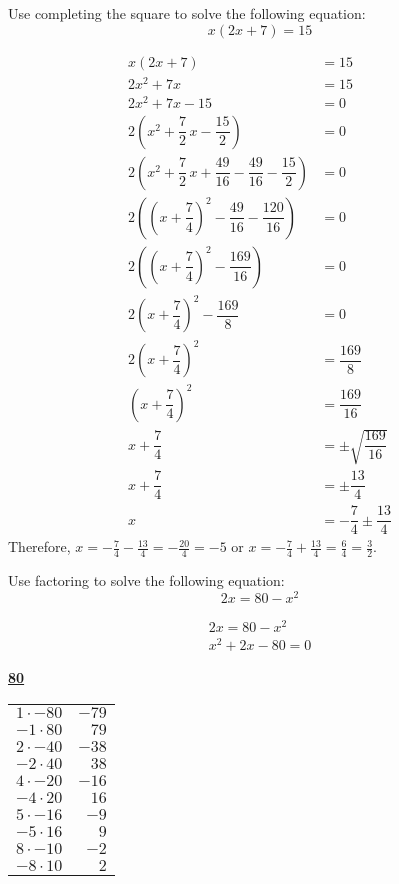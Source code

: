 \documentclass[11pt,letterpaper]{article}
\begin{document}

 Use completing the square to solve the following equation:
	\[
	x(2x + 7)= 15
	\] \pspace

\sol
	\[
	\begin{aligned}
	x(2x + 7)&= 15 \\[0.3cm]
	2x^2 + 7x&= 15 \\[0.3cm]
	2x^2 + 7x - 15&= 0 \\[0.3cm]
	2 \left(x^2 + \dfrac{7}{2}\,x - \dfrac{15}{2} \right)&= 0 \\[0.3cm]
	2 \left(x^2 + \dfrac{7}{2}\,x + \dfrac{49}{16} - \dfrac{49}{16} - \dfrac{15}{2} \right)&= 0 \\[0.3cm]
	2 \left( \left(x + \dfrac{7}{4} \right)^2 - \dfrac{49}{16} - \dfrac{120}{16} \right)&= 0 \\[0.3cm]
	2 \left( \left(x + \dfrac{7}{4} \right)^2  - \dfrac{169}{16} \right)&= 0 \\[0.3cm]
	2 \left(x + \dfrac{7}{4} \right)^2  - \dfrac{169}{8}&= 0 \\[0.3cm]
	2 \left(x + \dfrac{7}{4} \right)^2&= \dfrac{169}{8} \\[0.3cm] 
	\left(x + \dfrac{7}{4} \right)^2&= \dfrac{169}{16} \\[0.3cm]
	x + \dfrac{7}{4}&= \pm \sqrt{\dfrac{169}{16}} \\[0.3cm]
	x + \dfrac{7}{4}&= \pm \dfrac{13}{4} \\[0.3cm]
	x&= -\dfrac{7}{4} \pm \dfrac{13}{4}
	\end{aligned}
	\]
Therefore, $x= -\frac{7}{4} - \frac{13}{4}= -\frac{20}{4}= -5$ or $x= -\frac{7}{4} + \frac{13}{4}= \frac{6}{4}= \frac{3}{2}$. 


\newpage



 Use factoring to solve the following equation:
	\[
	2x= 80 - x^2
	\] \pspace

\sol
	\[
	\begin{aligned}
	2x= 80 - x^2 \\[0.3cm]
	x^2 + 2x - 80= 0 
	\end{aligned}
	\]

	\begin{table}[!ht]
	\centering
	\underline{\bfseries 80} \pvspace{0.2cm}
	\begin{tabular}{rr}
	$1 \cdot -80$ & $-79$ \\
	$-1 \cdot 80$ & $79$ \\
	$2 \cdot -40$ & $-38$ \\
	$-2 \cdot 40$ & $38$ \\
	$4 \cdot -20$ & $-16$ \\
	$-4 \cdot 20$ & $16$ \\
	$5 \cdot -16$ & $-9$ \\
	$-5 \cdot 16$ & $9$ \\
	$8 \cdot -10$ & $-2$ \\ \hline
	\multicolumn{1}{|r}{$-8 \cdot 10$} & \multicolumn{1}{r|}{$2$} \\ \hline
	\end{tabular}
	\end{table}
\end{document}
